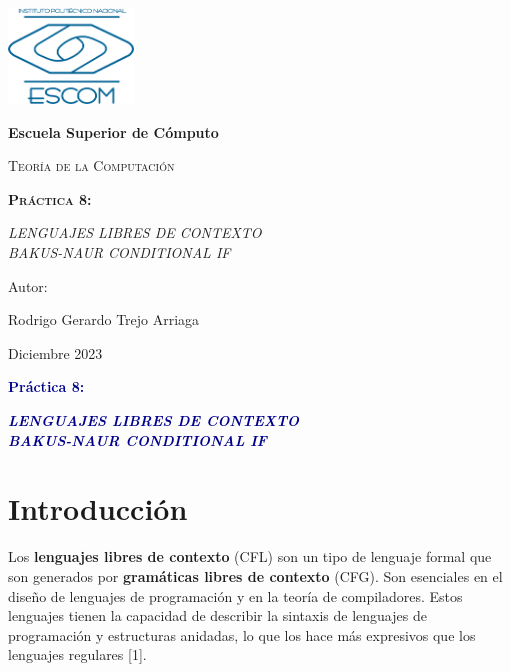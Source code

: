 \documentclass[11pt]{article} %
\begin{document}
	
	\begin{titlepage}
		\centering
		{\includegraphics[width=0.25\textwidth]{descarga}\par}
		\vspace{0.5cm}
		{\bfseries\huge Escuela Superior de Cómputo \par}
		\vspace{0.7cm}
		{\scshape\LARGE Teoría de la Computación \par}
		\vspace{0.3cm}
		\vspace{3.1cm}
		{\scshape \Huge \textbf{Práctica 8:}  \par}
		\vspace{0.03cm}
		{{\LARGE \textit{LENGUAJES LIBRES DE CONTEXTO\\ \vspace{3mm} BAKUS-NAUR CONDITIONAL IF}} \par}
		\vspace{3.5cm}
		{\Large Autor: \par}
		{\Large Rodrigo Gerardo Trejo Arriaga \par}
		\vspace{3cm}
		{\Large Diciembre 2023 \par}
	\end{titlepage}
	
	\begin{center}
		\vspace*{0.1cm}
		{\huge \textcolor{darkBlue}{\textbf{Práctica 8:}} \par}
		
		{\Large \textcolor{darkBlue}{\textbf{\textit{LENGUAJES LIBRES DE CONTEXTO\\ \vspace{3mm} BAKUS-NAUR CONDITIONAL IF}}}}
	\end{center}
	
	
	\section{Introducción}
	Los \textbf{lenguajes libres de contexto} (CFL) son un tipo de lenguaje formal que son generados por \textbf{gramáticas libres de contexto} (CFG). Son esenciales en el diseño de lenguajes de programación y en la teoría de compiladores. Estos lenguajes tienen la capacidad de describir la sintaxis de lenguajes de programación y estructuras anidadas, lo que los hace más expresivos que los lenguajes regulares [1].
	
\end{document}

